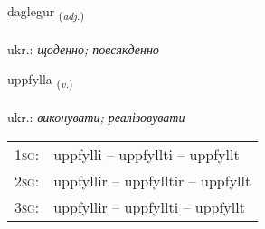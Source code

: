 \documentclass[frontgrid, backgrid]{flacards}\usepackage[]{graphicx}\usepackage[]{xcolor}
\begin{document}
\renewcommand{\flhead}{\vskip5pt \fboxsep=0pt {\small\bfseries\footnotesize Lýsingarorð | прикметник}}
\renewcommand{\fcfoot}{\vskip5pt \fboxsep=0pt \hspace{2pt}{\small\bfseries\footnotesize 2K}}

\renewcommand{\blhead}{\vskip5pt {\small\bfseries\footnotesize Lýsingarorð | прикметник }}
\renewcommand{\bcfoot}{\vskip5pt \hspace{2pt}{\small\bfseries\footnotesize 2K}}


{daglegur \small{\textsubscript{(\textit{adj.})}} \\[1ex] %
\textphonetic{[taɣlɛɣʏr]} \\
ukr.: \emph{щоденно; повсякденно} \\  [2ex]
\renewcommand*{\arraystretch}{0.8}
}

\renewcommand{\flhead}{\vskip5pt \fboxsep=0pt {\small\bfseries\footnotesize Sagnorð | дієслово}}
\renewcommand{\fcfoot}{\vskip5pt \fboxsep=0pt \hspace{2pt}{\small\bfseries\footnotesize 2K}}

\renewcommand{\blhead}{\vskip5pt {\small\bfseries\footnotesize Sagnorð | дієслово }}
\renewcommand{\bcfoot}{\vskip5pt \hspace{2pt}{\small\bfseries\footnotesize 2K}}


{uppfylla \small{\textsubscript{(\textit{v.})}} \\[1ex] %
\textphonetic{[ʏhpfɪtla]} \\
ukr.: \emph{виконувати; реалізовувати} \\  [2ex]
\renewcommand*{\arraystretch}{0.8}
\begin{tabular}{p{1cm}l}
\textsc{1sg}: & uppfylli -- uppfyllti -- uppfyllt \\ 
\textsc{2sg}: & uppfyllir -- uppfylltir -- uppfyllt \\ 
\textsc{3sg}: & uppfyllir -- uppfyllti -- uppfyllt \\ 
\end{tabular}
}
\end{document}
